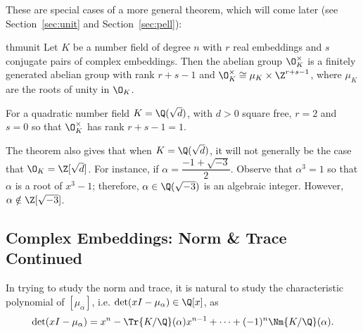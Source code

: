 These are special cases of a more general theorem, which will come later (see Section~\ref{sec:unit} and Section~\ref{sec:pell}): 




\begin{restatable*}{thm}{unit} \label{thm:unit}
Let $K$ be a number field of degree $n$ with $r$ real embeddings and $s$ conjugate pairs of complex embeddings. Then the abelian group $\O_K^\times$ is a finitely generated abelian group with rank $r+s-1$ and $\O_K^\times \cong \mu_K \times \Z^{r+s-1}$, where $\mu_K$ are the roots of unity in $\O_K$. 
\end{restatable*}

\begin{ex}
For a quadratic number field $K=\Q(\sqrt{d})$, with $d>0$ square free, $r=2$ and $s=0$ so that $\O_K^\times$ has rank $r+s-1=1$. \xqed
\end{ex}

\begin{ex}
The theorem also gives that when $K=\Q(\sqrt{d})$, it will not generally be the case that $\O_K= \Z[\sqrt{d}]$. For instance, if $\alpha=\dfrac{-1+\sqrt{-3}}{2}$. Observe that $\alpha^3=1$ so that $\alpha$ is a root of $x^3-1$; therefore, $\alpha \in \Q(\sqrt{-3})$ is an algebraic integer. However, $\alpha \notin \Z[\sqrt{-3}]$. \xqed
\end{ex}


\subsection{Complex Embeddings: Norm \& Trace Continued}


In trying to study the norm and trace, it is natural to study the characteristic polynomial of $[\mu_\alpha]$, i.e. $\det(xI-\mu_\alpha) \in \Q[x]$, as
	\[
	\det(xI-\mu_\alpha)=x^n - \Tr{K/\Q}(\alpha)x^{n-1} + \cdots + (-1)^n \Nm{K/\Q}(\alpha).
	\]

